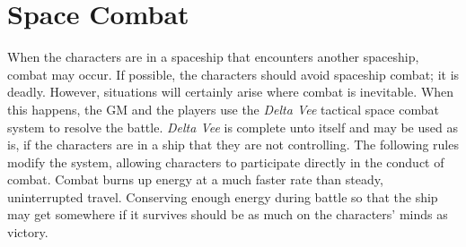 \begin{table}[htbp]
  \centering
\end{table}


\section{Space Combat}
\label{sec:space-combat}



When the characters are in a spaceship that encounters another
spaceship, combat may occur. If possible, the characters should avoid
spaceship combat; it is deadly. However, situations will certainly
arise where combat is inevitable. When this happens, the GM and the
players use the \emph{Delta Vee} tactical space combat system to
resolve the battle. \emph{Delta Vee} is complete unto itself and may
be used as is, if the characters are in a ship that they are not
controlling. The following rules modify the system, allowing
characters to participate directly in the conduct of combat. Combat
burns up energy at a much faster rate than steady, uninterrupted
travel. Conserving enough energy during battle so that the ship may
get somewhere if it survives should be as much on the characters'
minds as victory.

